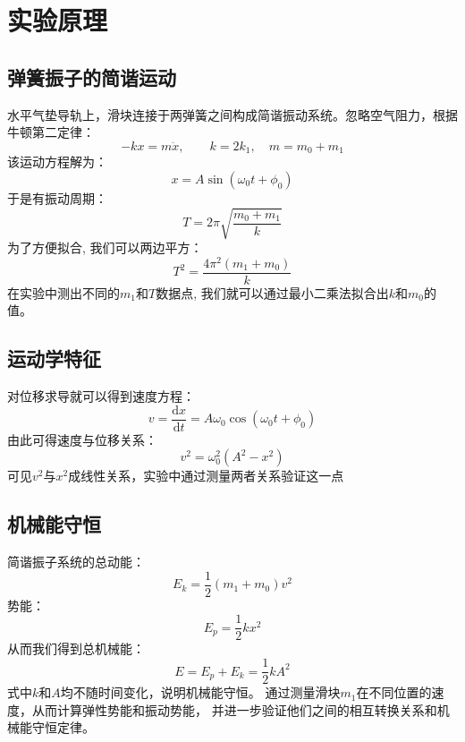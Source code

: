 \documentclass[zihao=5, UTF8]{article}
\renewcommand{\dd}{\mathrm{d}}
\theoremstyle{MyLineTheoremStyle} %
\theoremstyle{MyBlockTheoremStyle} %
\theoremstyle{MySubsubsectionStyle} %
\begin{document}
\section{实验原理}

\subsection{弹簧振子的简谐运动}
水平气垫导轨上，滑块连接于两弹簧之间构成简谐振动系统。忽略空气阻力，根据牛顿第二定律：
\begin{equation}
-kx = m\ddot{x}, \qquad k = 2k_1, \quad m = m_0 + m_1
\end{equation}
该运动方程解为：
\begin{equation}
x = A\sin(\omega_0t + \phi_0)
\end{equation}
于是有振动周期：
\begin{equation}
T = 2\pi\sqrt{\frac{m_0 + m_1}{k}}
\end{equation}
为了方便拟合, 我们可以两边平方：
\begin{equation}
T^2 = \frac{4\pi^2(m_1 + m_0)}{k}
\end{equation}
在实验中测出不同的$m_1$和$T$数据点, 我们就可以通过最小二乘法拟合出$k$和$m_0$的值。

\subsection{运动学特征}
对位移求导就可以得到速度方程：
\begin{equation}
v = \frac{\dd x}{\dd t} = A\omega_0\cos(\omega_0t + \phi_0)
\end{equation}
由此可得速度与位移关系：
\begin{equation}
v^2 = \omega_0^2(A^2 - x^2)
\end{equation}
可见$v^2$与$x^2$成线性关系，实验中通过测量两者关系验证这一点

\subsection{机械能守恒}
简谐振子系统的总动能：
\begin{equation}
E_k = \frac{1}{2}(m_1 + m_0)v^2
\end{equation}
势能：
\begin{equation}
E_p = \frac{1}{2}kx^2
\end{equation}
从而我们得到总机械能：
\begin{equation}
E = E_p + E_k = \frac{1}{2}kA^2
\end{equation}
式中$k$和$A$均不随时间变化，说明机械能守恒。
通过测量滑块$m_1$在不同位置的速度，从而计算弹性势能和振动势能，
并进一步验证他们之间的相互转换关系和机械能守恒定律。
\end{document}
